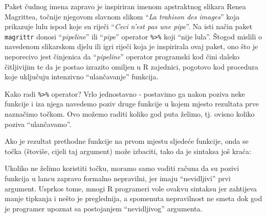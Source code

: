 \documentclass[]{book}
\newenvironment{Shaded}{\begin{snugshade}}{\end{snugshade}}
\newcommand{\KeywordTok}[1]{\textcolor[rgb]{0.13,0.29,0.53}{\textbf{#1}}}
\newcommand{\StringTok}[1]{\textcolor[rgb]{0.31,0.60,0.02}{#1}}
\newcommand{\CommentTok}[1]{\textcolor[rgb]{0.56,0.35,0.01}{\textit{#1}}}
\newcommand{\OperatorTok}[1]{\textcolor[rgb]{0.81,0.36,0.00}{\textbf{#1}}}
\newcommand{\NormalTok}[1]{#1}
\theoremstyle{definition}
\theoremstyle{definition}
\theoremstyle{definition}
\theoremstyle{remark}
\begin{document}
Paket čudnog imena zapravo je inspiriran imenom apstraktnog slikara
Renea Magrittea, točnije njegovom slavnom slikom ``\emph{La trahison des
images}'' koja prikazuje lulu ispod koje su riječi ``\emph{Ceci n'est
pas une pipe}''. Na isti način paket \texttt{magrittr} donosi
``\emph{pipeline}'' ili ``\emph{pipe}'' operator
\texttt{\%\textgreater{}\%} koji ``nije lula''. Štogod mislili o
navedenom slikarskom djelu ili igri riječi koja je inspirirala ovaj
paket, ono što je neporecivo jest činjenica da ``\emph{pipeline}''
operator programski kod čini daleko čitljivijim te da je postao izrazito
omiljen u R zajednici, pogotovo kod procedura koje uključuju intenzivno
``ulančavanje'' funkcija.

Kako radi \texttt{\%\textgreater{}\%} operator? Vrlo jednostavno -
postavimo ga nakon poziva neke funkcije i iza njega navedemo poziv druge
funkcije u kojem mjesto rezultata prve naznačimo točkom. Ovo možemo
raditi koliko god puta želimo, tj. ovisno koliko poziva ``ulančavamo''.

\begin{Shaded}
\end{Shaded}

Ako je rezultat prethodne funkcije na prvom mjestu sljedeće funkcije,
onda se točka (štoviše, cijeli taj argument) može izbaciti, tako da je
sintaksa još kraća:

\begin{Shaded}
\end{Shaded}

Ukoliko ne želimo koristiti točku, moramo samo voditi računa da su
pozivi funkcija u lancu zapravo formalno nepravilni, jer imaju
``nevidljivi'' prvi argument. Usprkos tome, mnogi R programeri vole
ovakvu sintaksu jer zahtijeva manje tipkanja i nešto je preglednija, a
spomenuta nepravilnost ne smeta dok god je programer upoznat sa
postojanjem ``nevidljivog'' argumenta.
\end{document}
